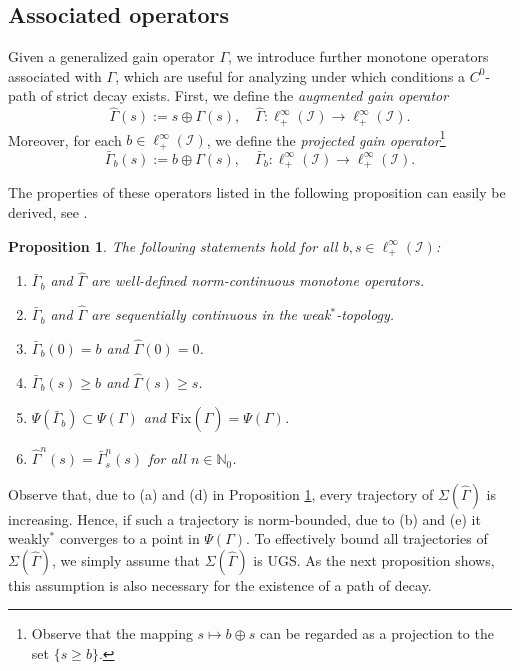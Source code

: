 \documentclass[10pt, oneside, a4paper]{article}
\newcommand{\N}{\mathbb{N}}
\newcommand{\Fix}{\mathrm{Fix}}
\newcommand{\IC}{\mathcal{I}}
\newcommand{\bsign}[1]{\bar{#1}}
\newtheorem{proposition}{Proposition}[section]
\begin{document}
\subsection{Associated operators}\label{subsec_associated_ops}

Given a generalized gain operator $\Gamma$, we introduce further monotone operators associated with $\Gamma$, which are useful for analyzing under which conditions a $C^0$-path of strict decay exists. First, we define the \emph{augmented gain operator}%
\begin{equation*}
  \hat{\Gamma}(s) := s \oplus \Gamma(s),\quad \hat{\Gamma}:\ell^{\infty}_+(\IC) \rightarrow \ell^{\infty}_+(\IC).%
\end{equation*}
Moreover, for each $b \in \ell^{\infty}_+(\IC)$, we define the \emph{projected gain operator}\footnote{Observe that the mapping $s \mapsto b \oplus s$ can be regarded as a projection to the set $\{ s \geq b \}$.}%
\begin{equation*}
	\bsign{\Gamma}_b(s) := b \oplus \Gamma(s),\quad \bsign{\Gamma}_b:\ell^{\infty}_+(\IC) \rightarrow \ell^{\infty}_+(\IC).%
\end{equation*}

The properties of these operators listed in the following proposition can easily be derived, see \cite[Prop.~3.1 and Lem.~3.2]{KZa}.%

\begin{proposition}\label{prop_hatgamma_properties}
The following statements hold for all $b,s \in \ell^{\infty}_+(\IC)$:%
\begin{enumerate}
\item[(a)] $\bsign{\Gamma}_b$ and $\hat{\Gamma}$ are well-defined norm-continuous monotone operators.%
\item[(b)] $\bsign{\Gamma}_b$ and $\hat{\Gamma}$ are sequentially continuous in the weak$^*$-topology.%
\item[(c)] $\bsign{\Gamma}_b(0) = b$ and $\hat{\Gamma}(0) = 0$.%
\item[(d)] $\bsign{\Gamma}_b(s) \geq b$ and $\hat{\Gamma}(s) \geq s$.%
\item[(e)] $\Psi(\bsign{\Gamma}_b) \subset \Psi(\Gamma)$ and $\Fix(\hat{\Gamma}) = \Psi(\Gamma)$.%
\item[(f)] $\hat{\Gamma}^n(s) = \bsign{\Gamma}_s^n(s)$ for all $n \in \N_0$.%
\end{enumerate}
\end{proposition}

Observe that, due to (a) and (d) in Proposition \ref{prop_hatgamma_properties}, every trajectory of $\Sigma(\hat{\Gamma})$ is increasing. Hence, if such a trajectory is norm-bounded, due to (b) and (e) it weakly$^*$ converges to a point in $\Psi(\Gamma)$. To effectively bound all trajectories of $\Sigma(\hat{\Gamma})$, we simply assume that $\Sigma(\hat{\Gamma})$ is UGS. As the next proposition shows, this assumption is also necessary for the existence of a path of decay.%
\end{document}
